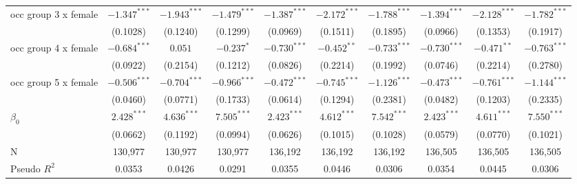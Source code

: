 \begin{tabular}{l|ccc|ccc|ccc}
occ group 3 x female       &          $-1.347^{***}$ &  $-1.943^{***}$ &  $-1.479^{***}$ &           $-1.387^{***}$ &  $-2.172^{***}$ &  $-1.788^{***}$ &           $-1.394^{***}$ &  $-2.128^{***}$ &  $-1.782^{***}$ \\
                           &                (0.1028) &        (0.1240) &        (0.1299) &                 (0.0969) &        (0.1511) &        (0.1895) &                 (0.0966) &        (0.1353) &        (0.1917) \\
occ group 4 x female       &          $-0.684^{***}$ &         $0.051$ &      $-0.237^*$ &           $-0.730^{***}$ &   $-0.452^{**}$ &  $-0.733^{***}$ &           $-0.730^{***}$ &   $-0.471^{**}$ &  $-0.763^{***}$ \\
                           &                (0.0922) &        (0.2154) &        (0.1212) &                 (0.0826) &        (0.2214) &        (0.1992) &                 (0.0746) &        (0.2214) &        (0.2780) \\
occ group 5 x female       &          $-0.506^{***}$ &  $-0.704^{***}$ &  $-0.966^{***}$ &           $-0.472^{***}$ &  $-0.745^{***}$ &  $-1.126^{***}$ &           $-0.473^{***}$ &  $-0.761^{***}$ &  $-1.144^{***}$ \\
                           &                (0.0460) &        (0.0771) &        (0.1733) &                 (0.0614) &        (0.1294) &        (0.2381) &                 (0.0482) &        (0.1203) &        (0.2335) \\
$\beta_0$                  &           $2.428^{***}$ &   $4.636^{***}$ &   $7.505^{***}$ &            $2.423^{***}$ &   $4.612^{***}$ &   $7.542^{***}$ &            $2.423^{***}$ &   $4.611^{***}$ &   $7.550^{***}$ \\
                           &                (0.0662) &        (0.1192) &        (0.0994) &                 (0.0626) &        (0.1015) &        (0.1028) &                 (0.0579) &        (0.0770) &        (0.1021) \\
N                          &                 130,977 &         130,977 &         130,977 &                  136,192 &         136,192 &         136,192 &                  136,505 &         136,505 &         136,505 \\
Pseudo $R^2$               &                  0.0353 &          0.0426 &          0.0291 &                   0.0355 &          0.0446 &          0.0306 &                   0.0354 &          0.0445 &          0.0306 \\
\bottomrule
\end{tabular}
